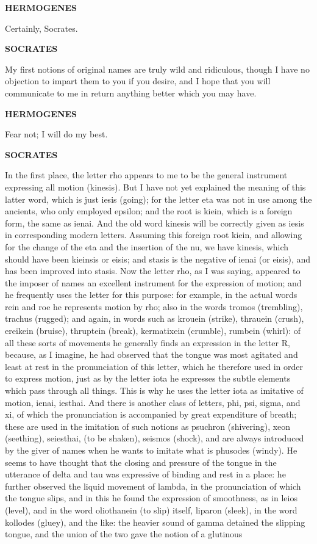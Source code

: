 \documentclass[11pt,letter]{article}
\begin{document}
\par \textbf{HERMOGENES}
\par   Certainly, Socrates.

\par \textbf{SOCRATES}
\par   My first notions of original names are truly wild and ridiculous, though I have no objection to impart them to you if you desire, and I hope that you will communicate to me in return anything better which you may have.

\par \textbf{HERMOGENES}
\par   Fear not; I will do my best.

\par \textbf{SOCRATES}
\par   In the first place, the letter rho appears to me to be the general instrument expressing all motion (kinesis). But I have not yet explained the meaning of this latter word, which is just iesis (going); for the letter eta was not in use among the ancients, who only employed epsilon; and the root is kiein, which is a foreign form, the same as ienai. And the old word kinesis will be correctly given as iesis in corresponding modern letters. Assuming this foreign root kiein, and allowing for the change of the eta and the insertion of the nu, we have kinesis, which should have been kieinsis or eisis; and stasis is the negative of ienai (or eisis), and has been improved into stasis. Now the letter rho, as I was saying, appeared to the imposer of names an excellent instrument for the expression of motion; and he frequently uses the letter for this purpose:  for example, in the actual words rein and roe he represents motion by rho; also in the words tromos (trembling), trachus (rugged); and again, in words such as krouein (strike), thrauein (crush), ereikein (bruise), thruptein (break), kermatixein (crumble), rumbein (whirl):  of all these sorts of movements he generally finds an expression in the letter R, because, as I imagine, he had observed that the tongue was most agitated and least at rest in the pronunciation of this letter, which he therefore used in order to express motion, just as by the letter iota he expresses the subtle elements which pass through all things. This is why he uses the letter iota as imitative of motion, ienai, iesthai. And there is another class of letters, phi, psi, sigma, and xi, of which the pronunciation is accompanied by great expenditure of breath; these are used in the imitation of such notions as psuchron (shivering), xeon (seething), seiesthai, (to be shaken), seismos (shock), and are always introduced by the giver of names when he wants to imitate what is phusodes (windy). He seems to have thought that the closing and pressure of the tongue in the utterance of delta and tau was expressive of binding and rest in a place:  he further observed the liquid movement of lambda, in the pronunciation of which the tongue slips, and in this he found the expression of smoothness, as in leios (level), and in the word oliothanein (to slip) itself, liparon (sleek), in the word kollodes (gluey), and the like:  the heavier sound of gamma detained the slipping tongue, and the union of the two gave the notion of a glutinous 
\end{document}
